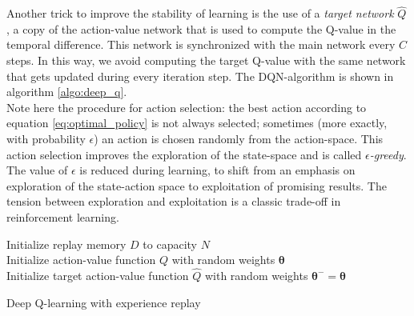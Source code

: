 Another trick to improve the stability of learning is the use of a \emph{target network}  $\hat{Q}$ \cite{mnih2015human}, a copy of the action-value network that is used to compute the Q-value in the temporal difference. This network is synchronized with the main network every $C$ steps. In this way, we avoid computing the target Q-value with the same network that gets updated during every iteration step. The DQN-algorithm is shown in algorithm \ref{algo:deep_q}. \\

Note here the procedure for action selection: the best action according to equation \ref{eq:optimal_policy} is not always selected; sometimes (more exactly, with probability $\epsilon$) an action is chosen randomly from the action-space. This action selection improves the exploration of the state-space and is called \emph{$\epsilon$-greedy}. The value of $\epsilon$ is reduced during learning, to shift from an emphasis on exploration of the state-action space to exploitation of promising results. The tension between exploration and exploitation is a classic trade-off in reinforcement learning.

\begin{algorithm}[H]
\SetAlgoLined
Initialize replay memory $D$ to capacity $N$\\
Initialize action-value function $Q$ with random weights $\bm{\theta}$\\
Initialize target action-value function $\hat{Q}$ with random weights $\bm{\theta}^- = \bm{\theta}$\\
 \caption{Deep Q-learning with experience replay}
 \label{algo:deep_q}
\end{algorithm}

